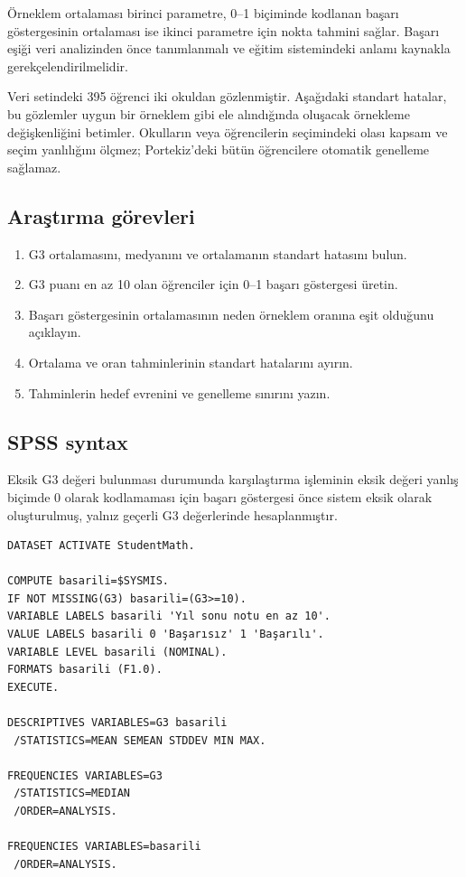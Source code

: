 Örneklem ortalaması birinci parametre, 0--1 biçiminde kodlanan başarı
göstergesinin ortalaması ise ikinci parametre için nokta tahmini sağlar.
Başarı eşiği veri analizinden önce tanımlanmalı ve eğitim sistemindeki anlamı
kaynakla gerekçelendirilmelidir.

\begin{researchbox}
Veri setindeki 395 öğrenci iki okuldan gözlenmiştir. Aşağıdaki standart
hatalar, bu gözlemler uygun bir örneklem gibi ele alındığında oluşacak
örnekleme değişkenliğini betimler. Okulların veya öğrencilerin seçimindeki
olası kapsam ve seçim yanlılığını ölçmez; Portekiz'deki bütün öğrencilere
otomatik genelleme sağlamaz.
\end{researchbox}

\subsection{Araştırma görevleri}

\begin{enumerate}
  \item G3 ortalamasını, medyanını ve ortalamanın standart hatasını bulun.
  \item G3 puanı en az 10 olan öğrenciler için 0--1 başarı göstergesi üretin.
  \item Başarı göstergesinin ortalamasının neden örneklem oranına eşit olduğunu açıklayın.
  \item Ortalama ve oran tahminlerinin standart hatalarını ayırın.
  \item Tahminlerin hedef evrenini ve genelleme sınırını yazın.
\end{enumerate}

\subsection{SPSS syntax}

Eksik G3 değeri bulunması durumunda karşılaştırma işleminin eksik değeri yanlış
biçimde 0 olarak kodlamaması için başarı göstergesi önce sistem eksik olarak
oluşturulmuş, yalnız geçerli G3 değerlerinde hesaplanmıştır.

\begin{lstlisting}[language={}]
DATASET ACTIVATE StudentMath.

COMPUTE basarili=$SYSMIS.
IF NOT MISSING(G3) basarili=(G3>=10).
VARIABLE LABELS basarili 'Yıl sonu notu en az 10'.
VALUE LABELS basarili 0 'Başarısız' 1 'Başarılı'.
VARIABLE LEVEL basarili (NOMINAL).
FORMATS basarili (F1.0).
EXECUTE.

DESCRIPTIVES VARIABLES=G3 basarili
 /STATISTICS=MEAN SEMEAN STDDEV MIN MAX.

FREQUENCIES VARIABLES=G3
 /STATISTICS=MEDIAN
 /ORDER=ANALYSIS.

FREQUENCIES VARIABLES=basarili
 /ORDER=ANALYSIS.
\end{lstlisting}

